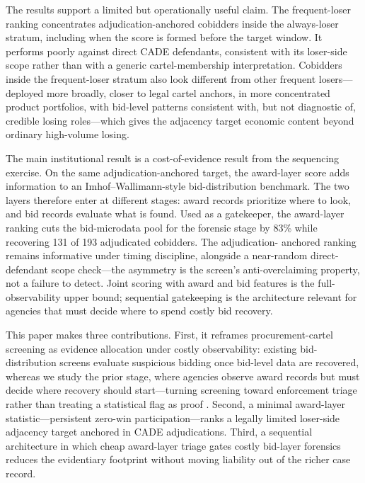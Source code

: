 The results support a limited but operationally useful claim.
The frequent-loser ranking concentrates adjudication-anchored
cobidders inside the always-loser stratum, including when the
score is formed before the target window. It performs poorly
against direct CADE defendants, consistent with its loser-side
scope rather than with a generic cartel-membership
interpretation. Cobidders inside the frequent-loser stratum also
look different from other frequent losers---deployed more broadly,
closer to legal cartel anchors, in more concentrated product
portfolios, with bid-level patterns consistent with, but not
diagnostic of, credible losing roles---which gives the adjacency
target economic content beyond ordinary high-volume losing.

The main institutional result is a cost-of-evidence result from
the sequencing exercise. On the same adjudication-anchored
target, the award-layer score adds information to an
Imhof--Wallimann-style bid-distribution benchmark. The two
layers therefore enter at different stages: award records
prioritize where to look, and bid records evaluate what is
found. Used as a gatekeeper, the award-layer ranking cuts the
bid-microdata pool for the forensic stage by 83\% while
recovering 131 of 193 adjudicated cobidders. The adjudication-
anchored ranking remains informative under timing discipline,
alongside a near-random direct-defendant scope check---the
asymmetry is the screen's anti-overclaiming property, not a
failure to detect. Joint scoring with award and bid features is
the full-observability upper bound; sequential gatekeeping is the
architecture relevant for agencies that must decide where to
spend costly bid recovery.

This paper makes three contributions. First, it reframes
procurement-cartel screening as evidence allocation under costly
observability: existing bid-distribution screens evaluate
suspicious bidding once bid-level data are recovered, whereas we
study the prior stage, where agencies observe award records but
must decide where recovery should start---turning screening
toward enforcement triage rather than treating a statistical flag
as proof
\citep{harrington2008detecting,sanchezgraells2019screening,chassang2022robust}.
Second, a minimal award-layer statistic---persistent zero-win
participation---ranks a legally limited loser-side adjacency
target anchored in CADE adjudications. Third, a sequential
architecture in which cheap award-layer triage gates costly
bid-layer forensics reduces the evidentiary footprint without
moving liability out of the richer case record.


